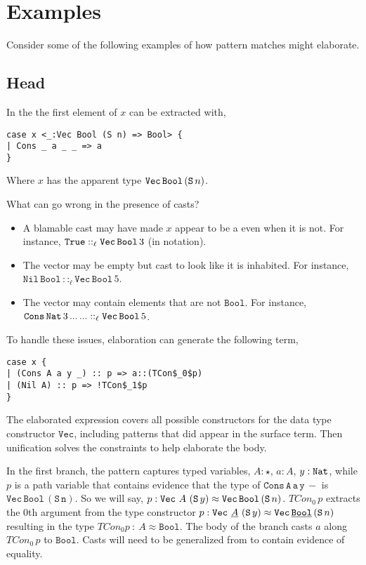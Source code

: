 \section{Examples}
 
Consider some of the following examples of how \slang{} pattern matches might elaborate.
 
\subsection{Head}
 
In the \slang{} the first element of $x$ can be extracted with,
 
\begin{lstlisting}[basicstyle={\ttfamily\small}]
case x <_:Vec Bool (S n) => Bool> {
| Cons _ a _ _ => a
}
\end{lstlisting}

Where $x$ has the apparent type $\mathtt{Vec}{}\,\mathtt{Bool}{}\,(\mathtt{S}{}\,n)$.

What can go wrong in the presence of casts?
\begin{itemize}
\item
A blamable cast may have made $x$ appear to be a \Vect{} even when it is not.
For instance, $\mathtt{True}{}::_{\ell}\mathtt{Vec}{}\,\mathtt{Bool}{}\,3$ (in  notation).
\item
The vector may be empty but cast to look like it is inhabited.
For instance, $\mathtt{Nil}\,\mathtt{Bool}\,::_{\ell}\mathtt{Vec}\,\mathtt{Bool}\,5$.
\item
The vector may contain elements that are not $\mathtt{Bool}$.
For instance, $\mathtt{Cons}\,\mathtt{Nat}{}\,3\,...\,...::_{\ell}\mathtt{Vec}\,\mathtt{Bool}\,5$.
\end{itemize}
 
To handle these issues, elaboration can generate the following \clang{} term,
 
\begin{lstlisting}[basicstyle={\ttfamily\small}]
case x {
| (Cons A a y _) :: p => a::(TCon$_0$p)
| (Nil A) :: p => !TCon$_1$p
}
\end{lstlisting}
 
The elaborated \case{} expression covers all possible constructors for the data type constructor $\mathtt{Vec}$, including patterns that did appear in the surface term.
Then unification solves the constraints to help elaborate the body.
 
In the first branch, the pattern captures typed variables, $A:\star$, $a:A$, $y:\mathtt{Nat}{}$, while $p$ is a path variable that contains evidence that the type of $\mathtt{Cons\,A\,a\,y\,-}$ is $\mathtt{Vec\,Bool\,(S\,n)}$.
So we will say, $p:\mathtt{Vec}\ A\ (\Suc{}\,y)\approx\mathtt{Vec}\,\mathtt{Bool}\,(\Suc{}\,n)$.
$TCon_{0}\,p$ extracts the 0th argument from the type constructor $p:\mathtt{Vec}\ \underline{A}\ (\Suc{}\,y)\approx\mathtt{Vec}\,\underline{\mathtt{Bool}}\,(\Suc{}\,n)$ resulting in the type $TCon_{0}p\ :\ A\approx\mathtt{Bool}$.
The body of the branch casts $a$ along $TCon_{0}\,p$ to $\mathtt{Bool}$.
Casts will need to be generalized from  to contain evidence of equality.
 
